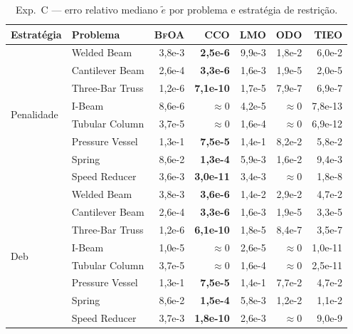 \documentclass[12pt, a4paper]{article}
\newcommand{\alg}[1]{\textsc{#1}}
\begin{document}
\begin{table}[h!]
\centering
\caption{Exp.~C — erro relativo mediano $\tilde{e}$ por problema e estratégia de restrição.}
\label{tab:exp_c_med}
\small
\begin{tabular}{llrrrrr}
\toprule
Estratégia & Problema & \alg{BfOA} & \alg{CCO} & \alg{LMO} & \alg{ODO} & \alg{TIEO} \\
\midrule
\multirow{8}{*}{Penalidade}
 & Welded Beam     & 3{,}8e-3 & \textbf{2{,}5e-6} & 9{,}9e-3 & 1{,}8e-2 & 6{,}0e-2 \\
 & Cantilever Beam & 2{,}6e-4 & \textbf{3{,}3e-6} & 1{,}6e-3 & 1{,}9e-5 & 2{,}0e-5 \\
 & Three-Bar Truss & 1{,}2e-6 & \textbf{7{,}1e-10} & 1{,}7e-5 & 7{,}9e-7 & 6{,}9e-7 \\
 & I-Beam          & 8{,}6e-6 & \textbf{${\approx}0$} & 4{,}2e-5 & \textbf{${\approx}0$} & 7{,}8e-13 \\
 & Tubular Column  & 3{,}7e-5 & \textbf{${\approx}0$} & 1{,}6e-4 & \textbf{${\approx}0$} & 6{,}9e-12 \\
 & Pressure Vessel & 1{,}3e-1 & \textbf{7{,}5e-5} & 1{,}4e-1 & 8{,}2e-2 & 5{,}8e-2 \\
 & Spring          & 8{,}6e-2 & \textbf{1{,}3e-4} & 5{,}9e-3 & 1{,}6e-2 & 9{,}4e-3 \\
 & Speed Reducer   & 3{,}6e-3 & \textbf{3{,}0e-11} & 3{,}4e-3 & \textbf{${\approx}0$} & 1{,}8e-8 \\
\midrule
\multirow{8}{*}{Deb}
 & Welded Beam     & 3{,}8e-3 & \textbf{3{,}6e-6} & 1{,}4e-2 & 2{,}9e-2 & 4{,}7e-2 \\
 & Cantilever Beam & 2{,}6e-4 & \textbf{3{,}3e-6} & 1{,}6e-3 & 1{,}9e-5 & 3{,}3e-5 \\
 & Three-Bar Truss & 1{,}2e-6 & \textbf{6{,}1e-10} & 1{,}8e-5 & 8{,}4e-7 & 3{,}5e-7 \\
 & I-Beam          & 1{,}0e-5 & \textbf{${\approx}0$} & 2{,}6e-5 & \textbf{${\approx}0$} & 1{,}0e-11 \\
 & Tubular Column  & 3{,}7e-5 & \textbf{${\approx}0$} & 1{,}6e-4 & \textbf{${\approx}0$} & 2{,}5e-11 \\
 & Pressure Vessel & 1{,}3e-1 & \textbf{7{,}5e-5} & 1{,}4e-1 & 7{,}7e-2 & 4{,}7e-2 \\
 & Spring          & 8{,}6e-2 & \textbf{1{,}5e-4} & 5{,}8e-3 & 1{,}2e-2 & 1{,}1e-2 \\
 & Speed Reducer   & 3{,}7e-3 & \textbf{1{,}8e-10} & 2{,}6e-3 & \textbf{${\approx}0$} & 9{,}0e-9 \\
\bottomrule
\end{tabular}
\end{table}
\end{document}
